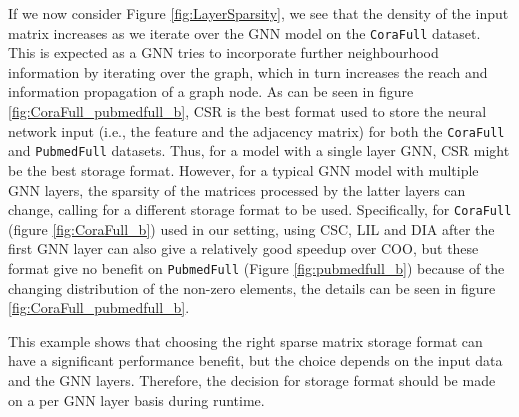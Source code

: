 If we now consider Figure \ref{fig:LayerSparsity}, we see that the density of the input matrix increases as we iterate over the GNN model
on the \texttt{CoraFull} dataset. This is expected as a GNN tries to incorporate further neighbourhood information by iterating over the
graph, which in turn increases the reach and information propagation of a graph node. As can be seen in figure \ref{fig:CoraFull_pubmedfull_b}, CSR is the best format used to store the
neural network input (i.e., the feature and the adjacency matrix) for both the \texttt{CoraFull} and \texttt{PubmedFull} datasets. Thus, for a
model with a single layer GNN, CSR might be the best storage format. However, for a typical GNN model with multiple GNN layers, the
sparsity of the matrices processed by the latter layers can change, calling for a different storage format to be used. Specifically, for
\texttt{CoraFull} (figure \ref{fig:CoraFull_b}) used in our setting, using CSC, LIL and DIA after the first GNN layer can also give a
relatively good speedup over COO, but these format give no benefit on \texttt{PubmedFull} (Figure \ref{fig:pubmedfull_b}) because of the
changing distribution of the non-zero elements, the details can be seen in figure \ref{fig:CoraFull_pubmedfull_b}.

 This example shows that choosing the right sparse matrix storage format can have a significant performance
benefit, but the choice depends on the input data and the GNN layers. Therefore, the decision for storage format should be made on a per GNN layer basis during runtime.
